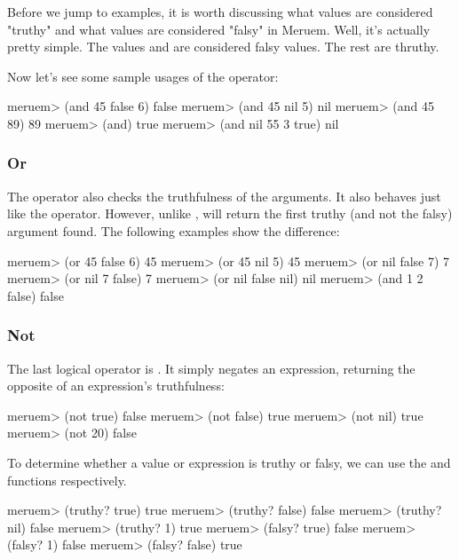 Before we jump to examples, it is worth discussing what values are considered "truthy" and what values are considered "falsy" in Meruem. Well, it's actually pretty simple. The values  and  are considered falsy values. The rest are thruthy.

Now let's see some sample usages of the  operator:

\begin{REPL}
meruem> (and 45 false 6)
false
meruem> (and 45 nil 5)
nil
meruem> (and 45 89)
89
meruem> (and)
true
meruem> (and nil 55 3 true)
nil
\end{REPL}

\subsubsection{Or}
The  operator also checks the truthfulness of the arguments. It also behaves just like the  operator. However, unlike ,  will return the first truthy (and not the falsy) argument found. The following examples show the difference:

\begin{REPL}
meruem> (or 45 false 6)
45
meruem> (or 45 nil 5)
45
meruem> (or nil false 7)
7
meruem> (or nil 7 false)
7
meruem> (or nil false nil)  
nil
meruem> (and 1 2 false)
false
\end{REPL}

\subsubsection{Not}
The last logical operator is . It simply negates an expression, returning the opposite of an expression's truthfulness:

\begin{REPL}
meruem> (not true)
false
meruem> (not false)
true
meruem> (not nil)
true
meruem> (not 20)
false
\end{REPL}

To determine whether a value or expression is truthy or falsy, we can use the  and  functions respectively.

\begin{REPL}
meruem> (truthy? true)
true
meruem> (truthy? false)
false
meruem> (truthy? nil)
false
meruem> (truthy? 1)
true
meruem> (falsy? true)
false
meruem> (falsy? 1)
false
meruem> (falsy? false)
true
\end{REPL}

